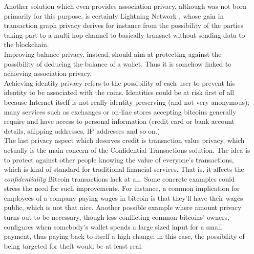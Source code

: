 Another solution which even provides association privacy, although was not born primarily for this purpose, is certainly Lightning Network \cite{RefWork:18}, whose gain in transaction graph privacy derives for instance from the possibility of the parties taking part to a multi-hop channel to basically transact without sending data to the blockchain. \\ 
Improving balance privacy, instead, should aim at protecting against the possibility of deducing the balance of a wallet. Thus it is somehow linked to achieving association privacy.\\
Achieving identity privacy refers to the possibility of each user to prevent his identity to be associated with the coins. Identities could be at risk first of all because Internet itself is not really identity preserving (and not very anonymous); many services such as exchanges or on-line stores accepting bitcoins generally require and have access to personal information (credit card or bank account details, shipping addresses, IP addresses and so on.)\\
The last privacy aspect which deserves credit is transaction value privacy, which actually is the main concern of the Confidential Transactions \cite{Max15} solution. The idea is to protect against other people knowing the value of everyone's transactions, which is kind of standard for traditional financial services. That is, it affects the \textit{confidentiality} Bitcoin transactions lack at all. Some concrete examples could stress the need for such improvements. For instance, a common implication for employees of a company paying wages in bitcoin is that they'll have their wages public, which is not that nice. Another possible example where amount privacy turns out to be necessary, though less conflicting common bitcoins' owners, configures when somebody's wallet spends a large sized input for a small payment, thus paying back to itself a high change; in this case, the possibility of being targeted for theft would be at least real.

